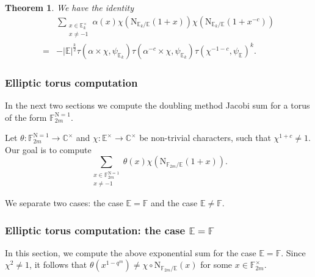 \documentclass[12pt, reqno]{amsart}
\newtheorem{theorem}{Theorem}[section]
\theoremstyle{definition}
\theoremstyle{definition}
\theoremstyle{definition}
\newcommand{\cComplex}{\mathbb{C}}
\newcommand{\multiplicativegroup}[1]{#1^{\times}}
\newcommand{\sizeof}[1]{\left|#1\right|}
\newcommand{\fieldCharacter}{\psi}
\newcommand{\minusInvolution}[1]{#1^{-c}}
\newcommand{\involutionPlusOne}[1]{#1^{1+c}}
\newcommand{\minusInvolutionMinusOne}[1]{#1^{-1-c}}
\newcommand{\aFieldNorm}{\mathrm{N}}
\newcommand{\finiteField}{\mathbb{F}}
\newcommand{\quadraticExtension}{\mathbb{E}}
\newcommand{\finiteFieldExtension}[1]{\finiteField_{#1}}
\newcommand{\quadraticFieldExtension}[1]{\quadraticExtension_{#1}}
\newcommand{\NormOneGroup}[1]{\finiteFieldExtension{#1}^{\aFieldNorm = 1}}
\newcommand{\GaussSumSingleCharacter}[2]{\tau\left(#1, #2\right)}
\newcommand{\GaussSumCharacter}[3]{\tau\left(#1 \times #2, #3\right)}
\begin{document}
\begin{theorem}\label{thm:split-case-deligne-lusztig-computation}We have the identity
\begin{align*}
	& \sum_{\substack{x \in \multiplicativegroup{\quadraticFieldExtension{k}}\\
			x \ne -1}} \alpha \left(x\right) \chi\left(\aFieldNorm_{\quadraticFieldExtension{k} \slash \quadraticExtension}\left(1 + x\right)\right) \chi\left(\aFieldNorm_{\quadraticFieldExtension{k} \slash \quadraticExtension}\left(1 + \minusInvolution{x}\right)\right) \\
	=& -\sizeof{\quadraticExtension}^{\frac{k}{2}} \GaussSumCharacter{\alpha}{\chi}{\fieldCharacter_{\quadraticFieldExtension{k}}} \GaussSumCharacter{\minusInvolution{\alpha}}{\chi}{\fieldCharacter_{\quadraticFieldExtension{k}}} \GaussSumSingleCharacter{\minusInvolutionMinusOne{\chi}}{\fieldCharacter_{\quadraticExtension}}^k.
\end{align*}
\end{theorem}

\subsubsection{Elliptic torus computation}
In the next two sections we compute the doubling method Jacobi sum for a torus of the form $\NormOneGroup{2m}$.

Let $\theta \colon \NormOneGroup{2m} \to \multiplicativegroup{\cComplex}$ and $\chi \colon \multiplicativegroup{\quadraticExtension} \to \multiplicativegroup{\cComplex}$ be non-trivial characters, such that $\involutionPlusOne{\chi} \ne 1$. Our goal is to compute $$\sum_{\substack{x \in \NormOneGroup{2m}\\
		x \ne -1}} \theta \left(x\right) \chi\left(\aFieldNorm_{\finiteFieldExtension{2m} \slash \quadraticExtension}\left(1 + x\right)\right).$$

We separate two cases: the case $\quadraticExtension = \finiteField$ and the case $\quadraticExtension \ne \finiteField$.

\subsubsection{Elliptic torus computation: the case $\quadraticExtension = \finiteField$}
In this section, we compute the above exponential sum for the case $\quadraticExtension = \finiteField$. Since $\chi^2 \ne 1$, it follows that $\theta\left(x^{1-q^m}\right) \ne \chi \circ \aFieldNorm_{\finiteFieldExtension{2m} \slash \quadraticExtension}\left(x\right)$ for some $x \in \multiplicativegroup{\finiteFieldExtension{2m}}$.
\end{document}
